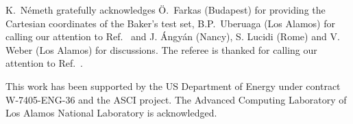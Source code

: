 \documentclass[prl,aps,preprint,superbib,12pt]{revtex4}
\begin{document}
\begin{acknowledgments}
K.~N{\'e}meth gratefully acknowledges {\"{O}}.~Farkas (Budapest) for providing the 
Cartesian coordinates of the Baker's test set,  B.P.~Uberuaga (Los Alamos) for 
calling our attention to Ref.~ and  J. {\'A}ngy{\'a}n
(Nancy), S. Lucidi (Rome) and V. Weber (Los Alamos) for discussions.
The referee is thanked for calling our attention to 
Ref.~.

This work has been supported by the US Department of Energy 
under contract W-7405-ENG-36 and the ASCI project.  
The Advanced Computing Laboratory of Los 
Alamos National Laboratory is acknowledged.
\end{acknowledgments}


\end{document}
